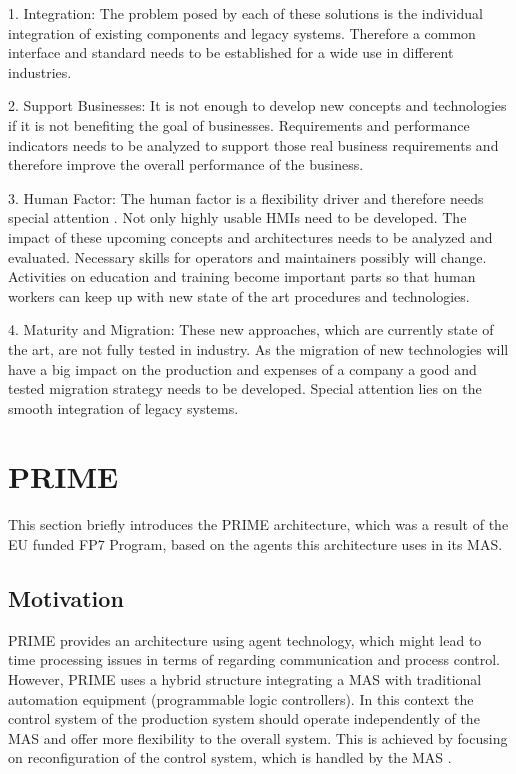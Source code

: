 \documentclass[conference,compsoc,hidelinks]{IEEEtran}
\begin{document}
1. Integration: The problem posed by each of these solutions is the individual integration of existing components and legacy systems. Therefore a common interface and standard needs to be established for a wide use in different industries.

2. Support Businesses: It is not enough to develop new concepts and technologies if it is not benefiting the goal of businesses. Requirements and performance indicators needs to be analyzed to support those real business requirements and therefore improve the overall performance of the business.

3. Human Factor:  The human factor is a flexibility driver and therefore needs special attention \cite{Colombo2009}. Not only highly usable HMIs need to be developed. The impact of these upcoming concepts and architectures needs to be analyzed and evaluated. Necessary skills for operators and maintainers possibly will change. Activities on education and training become important parts so that human workers can keep up with new state of the art procedures and technologies.

4. Maturity and Migration: These new approaches, which are currently state of the art, are not fully tested in industry. As the migration of new technologies will have a big impact on the production and expenses of a company a good and tested migration strategy needs to be developed. Special attention lies on the smooth integration of legacy systems.

\section{PRIME} \label{sec:PRIME}%

This section briefly introduces the PRIME architecture, which was a result of the EU funded FP7 Program, based on the agents this architecture uses in its MAS.
\subsection{Motivation}
PRIME provides an architecture using agent technology, which might lead to time processing issues in terms of regarding communication and process control. However, PRIME uses a hybrid structure integrating a MAS with traditional automation equipment (programmable logic controllers). In this context the control system of the production system should operate independently of the MAS and offer more flexibility to the overall system. This is achieved by focusing on reconfiguration of the control system, which is handled by the MAS \cite{Hybrid}.
\end{document}
